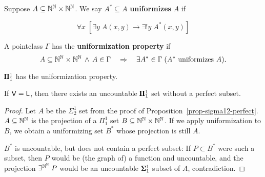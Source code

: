 \begin{definition}\label{def-uniformization}Suppose $A \subseteq \mathbb{N}^{\mathbb{N}} \times \mathbb{N}^{\mathbb{N}}$. We say $A^* \subseteq A$ \textbf{uniformizes} $A$ if

\begin{equation}
\forall x  \; [ \exists y \; A(x,y) \to  \exists ! y \; A^*(x,y)]
\end{equation}

A pointclass $\Gamma$ has the \textbf{uniformization property} if
\begin{equation*}
A \subseteq \mathbb{N}^{\mathbb{N}}  \times \mathbb{N}^{\mathbb{N}} \, \wedge \, A \in \Gamma \quad \Rightarrow \quad \exists A^* \in  \Gamma \; (A^*  \text{ uniformizes } A).
\end{equation*}
\end{definition}\begin{theorem}[Kondo]\label{thm-kondo}$\pmb{\Pi}^1_1$ has the uniformization property.

\end{theorem}\begin{theorem}\label{thm-prefect-set-l}If $\mathsf{V=L}$, then there exists an uncountable $\pmb{\Pi}^1_1$ set without a perfect subset.

\end{theorem}\begin{proof}Let $A$ be the $\Sigma^1_2$ set from the proof of Proposition~\ref{prop-sigma12-perfect}. $A \subseteq \mathbb{N}^{\mathbb{N}}$ is the projection of a $\Pi^1_1$ set $B \subseteq \mathbb{N}^{\mathbb{N}} \times \mathbb{N}^{\mathbb{N}}$. If we apply uniformization to $B$, we obtain a uniformizing set $B^*$ whose projection is still $A$.

$B^*$ is uncountable, but does not contain a perfect subset: If $P \subset B^*$ were such a subset, then $P$ would be (the graph of) a function and uncountable, and the projection $\exists^{\mathbb{N}^{\mathbb{N}}} \; P$ would be an uncountable  $\pmb{\Sigma}^1_1$ subset of $A$, contradiction.

\end{proof}